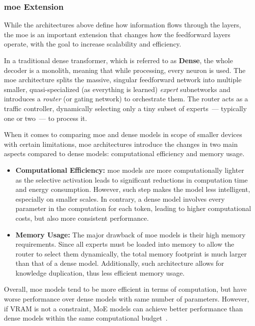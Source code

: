 \subsubsection{\gls{moe} Extension}

While the architectures above define how information flows through the layers,
the \gls{moe} is an important extension that changes how the feedforward layers
operate, with the goal to increase scalability and efficiency.

In a traditional dense transformer, which is referred to as \textbf{Dense}, the
whole decoder is a monolith, meaning that while processing, every neuron is
used. The \gls{moe} architecture splits the massive, singular feedforward
network into multiple smaller, quasi-specialized (as everything is learned)
\textsl{expert} subnetworks and introduces a \textsl{router} (or gating network)
to orchestrate them. The router acts as a traffic controller, dynamically
selecting only a tiny subset of experts~--- typically one or two~--- to process
it.

When it comes to comparing \gls{moe} and dense models in scope of smaller
devices with certain limitations, \gls{moe} architectures introduce the changes
in two main aspects compared to dense models: computational efficiency and
memory usage.
\begin{itemize}
  \item \textbf{Computational Efficiency:} \gls{moe} models are more
    computationally
    lighter as the selective activation leads to significant reductions in
    computation time and energy consumption. However, such step makes the
    model less intelligent, especially on smaller scales. In contrary, a
    dense model involves every parameter in the computation for each token,
    leading to higher computational costs, but also more consistent performance.
  \item \textbf{Memory Usage:} The major drawback of \gls{moe} models
    is their high
    memory requirements. Since all experts must be loaded into memory to allow
    the router to select them dynamically, the total memory footprint is
    much larger than that of a dense model. Additionally, such architecture
    allows for knowledge duplication, thus less efficient memory usage.
\end{itemize}
Overall, \gls{moe} models tend to be more efficient in terms of computation, but
have worse performance over dense models with same number of parameters.
However, if VRAM is not a constraint, MoE models can achieve better performance
than dense models within the same computational budget~\cite{dai2024deepseekmoe}.

